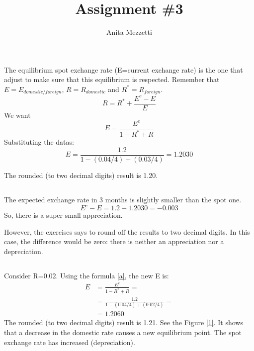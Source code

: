 \documentclass[	11pt, ]{fphw}
\title{Assignment \#3} %
\author{Anita Mezzetti}
\institute{École polytechnique fédérale de Lausanne}
\begin{document}
\maketitle 
\section{}
\subsection{}
The equilibrium spot exchange rate (E=current exchange rate) is the one that adjust to make sure that this equilibrium is respected. Remember that $E=E_{domestic/foreign}$, $R=R_{domestic}$ and $R^{*}=R_{foreign}$.
\[ R = R^{*} + \frac{E^{e}-E}{E}\]
We want 
\begin{equation} \label{a}
E= \frac{E^{e}}{1-R^{*}+R} 
\end{equation}
Substituting the datas:
\begin{equation}  
E = \frac{ 1.2 }{ 1- (0.04/4) + (0.03/4) }  = 1.2030
\end{equation}

The rounded (to two decimal digits) result is 1.20. 

\subsection{}
The expected exchange rate in 3 months is slightly smaller than the spot one.
\[ E^{e}-E= 1.2 - 1.2030 = -0.003 \]
So, there is a super small appreciation.
\par However, the exercises says to round off the results to two decimal digits. In this case, the difference would be zero: there is neither an appreciation nor a depreciation. 


\subsection{}
Consider R=0.02. Using the formula \ref{a}, the new E is: 
\begin{equation} 
\begin{aligned}    
E & = \frac{E^{e}}{1-R^{*}+R} = \\
  & = \frac{ 1.2 }{ 1- (0.04/4) + (0.02/4) } =\\
  & = 1.2060
\end{aligned} 
\end{equation}
The rounded (to two decimal digits) result is 1.21. See the Figure \vref{1}. It shows that a decrease in the domestic rate causes a new equilibrium point. The spot exchange rate has increased (depreciation). 
\end{document}
